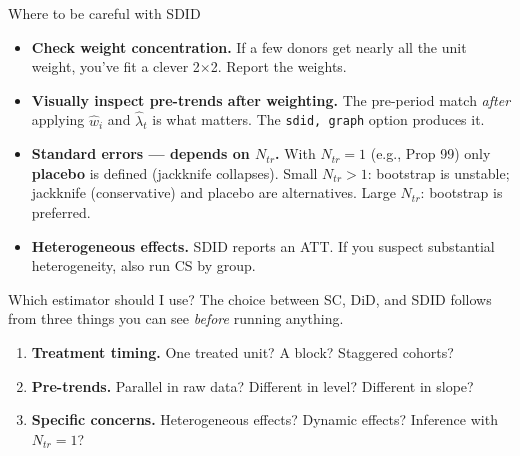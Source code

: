 \documentclass[aspectratio=169,11pt]{beamer}
\begin{document}
\begin{frame}{Where to be careful with SDID}
\vspace{0.5em}
\begin{itemize}
  \item \textbf{Check weight concentration.} \;If a few donors get nearly all the unit weight, you've fit a clever 2$\times$2. \;Report the weights.
  \vspace{0.3em}
  \item \textbf{Visually inspect pre-trends after weighting.} \;The pre-period match \textit{after} applying $\widehat{w}_i$ and $\widehat{\lambda}_t$ is what matters. \;The \texttt{sdid, graph} option produces it.
  \vspace{0.3em}
  \item \textbf{Standard errors --- depends on $N_{tr}$.} \;With $N_{tr}=1$ (e.g., Prop 99) only \textbf{placebo} is defined (jackknife collapses). \;Small $N_{tr}>1$: bootstrap is unstable; jackknife (conservative) and placebo are alternatives. \;Large $N_{tr}$: bootstrap is preferred.
  \vspace{0.3em}
  \item \textbf{Heterogeneous effects.} \;SDID reports an ATT. \;If you suspect substantial heterogeneity, also run CS by group.
\end{itemize}
\end{frame}


\begin{frame}{Which estimator should I use?}
\footnotesize
The choice between SC, DiD, and SDID follows from three things you can see \textit{before} running anything.

\vspace{0.6em}
\begin{enumerate}\setlength\itemsep{6pt}
  \item \textbf{Treatment timing.} \;One treated unit? A block? Staggered cohorts?
  \item \textbf{Pre-trends.} \;Parallel in raw data? Different in level? Different in slope?
  \item \textbf{Specific concerns.} \;Heterogeneous effects? Dynamic effects? Inference with $N_{tr}=1$?
\end{enumerate}

\vspace{0.8em}

\vspace{0.4em}
\end{frame}
\end{document}

